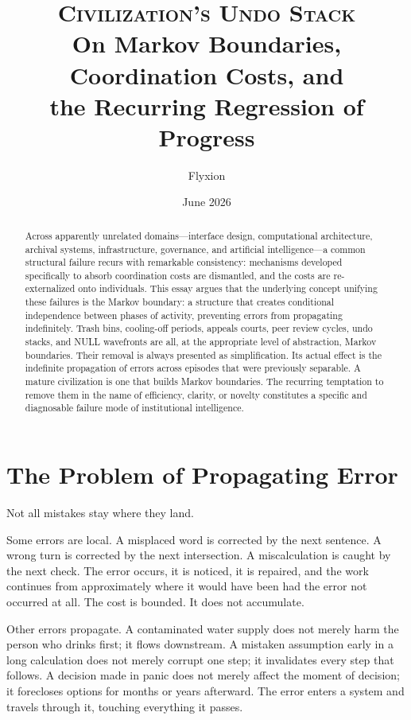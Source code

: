 \documentclass[12pt, a4paper]{article}
\title{\textsc{Civilization's Undo Stack}\\
\large On Markov Boundaries, Coordination Costs, and\\
the Recurring Regression of Progress}
\author{Flyxion}
\date{June 2026}
\begin{document}
\maketitle

\begin{abstract}
Across apparently unrelated domains---interface design, computational
architecture, archival systems, infrastructure, governance, and
artificial intelligence---a common structural failure recurs with
remarkable consistency: mechanisms developed specifically to absorb
coordination costs are dismantled, and the costs are re-externalized
onto individuals. This essay argues that the underlying concept
unifying these failures is the Markov boundary: a structure that
creates conditional independence between phases of activity, preventing
errors from propagating indefinitely. Trash bins, cooling-off periods,
appeals courts, peer review cycles, undo stacks, and NULL wavefronts
are all, at the appropriate level of abstraction, Markov boundaries.
Their removal is always presented as simplification. Its actual
effect is the indefinite propagation of errors across episodes that
were previously separable. A mature civilization is one that builds
Markov boundaries. The recurring temptation to remove them in the
name of efficiency, clarity, or novelty constitutes a specific and
diagnosable failure mode of institutional intelligence.
\end{abstract}

\section{The Problem of Propagating Error}

Not all mistakes stay where they land.

Some errors are local. A misplaced word is corrected by the next
sentence. A wrong turn is corrected by the next intersection. A
miscalculation is caught by the next check. The error occurs, it is
noticed, it is repaired, and the work continues from approximately
where it would have been had the error not occurred at all. The cost
is bounded. It does not accumulate.

Other errors propagate. A contaminated water supply does not merely
harm the person who drinks first; it flows downstream. A mistaken
assumption early in a long calculation does not merely corrupt one
step; it invalidates every step that follows. A decision made in panic
does not merely affect the moment of decision; it forecloses options
for months or years afterward. The error enters a system and travels
through it, touching everything it passes.
\end{document}
